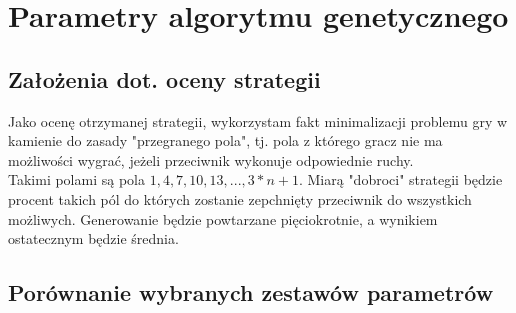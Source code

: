 \documentclass[a4paper,12pkt]{article}
\begin{document}
\section{Parametry algorytmu genetycznego}
\subsection{Założenia dot. oceny strategii}
Jako ocenę otrzymanej strategii, wykorzystam fakt minimalizacji problemu gry w kamienie do zasady "przegranego pola", tj. pola z którego gracz nie ma możliwości wygrać, jeżeli przeciwnik wykonuje odpowiednie ruchy.\\
Takimi polami są pola $1,4,7,10,13,...,3*n+1$. Miarą "dobroci" strategii będzie procent takich pól do których zostanie zepchnięty przeciwnik do wszystkich możliwych. Generowanie będzie powtarzane pięciokrotnie, a wynikiem ostatecznym będzie średnia.
\subsection{Porównanie wybranych zestawów parametrów}
\end{document}
